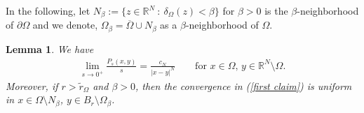 \documentclass[notitlepage,11pt,reqno]{amsart}
\newtheorem{lemma}[theorem]{Lemma}
\theoremstyle{definition}
\numberwithin{equation}{section}
\newcommand{\R}{\mathds{R}}
\begin{document}
In the following, let $N_\beta:=   \{z \in \R^N\::\: \delta_{\Omega}(z) < \beta\}$ for $\beta>0$ is the $\beta$-neighborhood of $\partial \Omega$ and we denote, $\Omega_{\beta}=\overline{\Omega}\cup N_{\beta}$ as a $\beta$-neighborhood of $\Omega$.


\begin{lemma}
  \label{local-Poisson-kernel-convergence}
  We have
  \begin{align}\label{first claim}
    \lim_{s \to 0^+} \frac{P_s(x, y)}{s}= \frac{c_N}{|x-y|^N} \qquad \text{for $x \in \Omega$, $y \in \R^N \setminus \Omega$.}
  \end{align}
Moreover, if $r>\tilde r_\Omega$ and $\beta>0$, then the convergence in (\ref{first claim}) is uniform in $x \in \Omega \setminus N_\beta$, $y \in B_r \setminus \Omega_{\beta}$.
\end{lemma}
\end{document}
